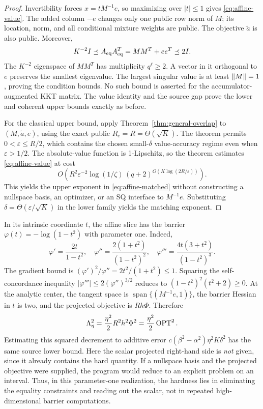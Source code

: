 \begin{proof}
Invertibility forces $x=tM^{-1}e$, so maximizing over $|t|\leq1$
gives \eqref{eq:affine-value}.  The added column $-e$ changes only one
public row norm of $M$; its location, norm, and all conditional mixture
weights are public.  The objective $\widetilde a$ is also public.
Moreover,
\[
 K^{-2}I\preceq A_{\rm eq}A_{\rm eq}^T=MM^T+ee^T\preceq2I.
\]
The $K^{-2}$ eigenspace of $MM^T$ has multiplicity $q^\ell\geq2$.
A vector in it orthogonal to $e$ preserves the smallest eigenvalue.
The largest singular value is at least $\left\lVert M\right\rVert=1$, proving the
condition bounds.  No such bound is asserted for the accumulator-augmented
KKT matrix.  The value identity and the source gap prove the lower
and coherent upper bounds exactly as before.

For the classical upper bound, apply Theorem~\ref{thm:general-overlap}
to $(M,\widetilde a,e)$, using the exact public
$R_e=R=\Theta(\sqrt K)$.  The theorem permits
$0<\varepsilon\leq R/2$, which contains the chosen small-$\delta$
value-accuracy regime even when $\varepsilon>1/2$.
The absolute-value function is 1-Lipschitz,
so the theorem estimates \eqref{eq:affine-value} at cost
\[
 O\left(R^2\varepsilon^{-2}\log(1/\zeta)\,
       (q+2)^{O(K\log(2R/\varepsilon))}\right).
\]
This yields the upper exponent in \eqref{eq:affine-matched} without
constructing a nullspace basis, an optimizer, or an SQ interface to
$M^{-1}e$.  Substituting $\delta=\Theta(\varepsilon/\sqrt K)$ in
the lower family yields the matching exponent.
\end{proof}

In its intrinsic coordinate $t$, the affine slice has the barrier
$\varphi(t)=-\log(1-t^2)$ with parameter one.  Indeed,
\[
 \varphi'=\frac{2t}{1-t^2},\quad
 \varphi''=\frac{2(1+t^2)}{(1-t^2)^2},\quad
 \varphi'''=\frac{4t(3+t^2)}{(1-t^2)^3}.
\]
The gradient bound is $(\varphi')^2/\varphi''=2t^2/(1+t^2)\leq1$.
Squaring the self-concordance inequality
$|\varphi'''|\leq2(\varphi'')^{3/2}$ reduces to
$(1-t^2)^2(t^2+2)\geq0$.
At the analytic center, the tangent space is
$\operatorname{span}\{(M^{-1}e,1)\}$, the barrier Hessian in $t$ is two,
and the projected objective is $Rh\Phi$.  Therefore
\begin{equation}\label{eq:affine-decrement}
 \Lambda_\eta^2=\frac{\eta^2}{2}R^2h^2\Phi^2
              =\frac{\eta^2}{2}\operatorname{OPT}^2.
\end{equation}
Estimating this squared decrement to additive error
$c(\beta^2-\alpha^2)\eta^2 K\delta^2$ has the same source lower bound.
Here the scalar projected right-hand side is \emph{not} given, since it
already contains the hard quantity.  If a nullspace
basis and the projected objective were supplied, the program would reduce
to an explicit problem on an interval.  Thus, in this parameter-one realization, the hardness lies in eliminating the equality
constraints and reading out the scalar, not in repeated high-dimensional
barrier computations.

